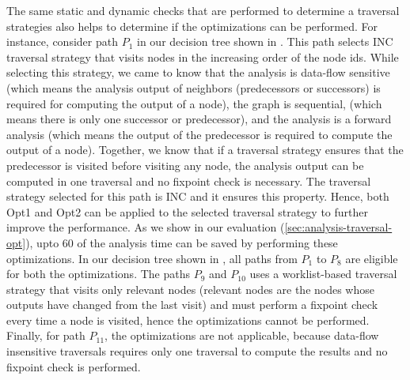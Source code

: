 The same static and dynamic checks that are performed to determine a traversal strategies
also helps to determine if the optimizations can be performed. For instance, consider path
$P_1$ in our decision tree shown in . This path selects INC traversal strategy that
visits nodes in the increasing order of the node ids. While selecting this strategy, we came to know that the analysis is data-flow sensitive (which means the analysis output of neighbors
(predecessors or successors) is required for computing the output of a node), the graph is
sequential, (which means there is only one successor or predecessor), and the analysis is a
forward analysis (which means the output of the predecessor is required to compute the
output of a node). Together, we know that if a traversal strategy ensures that the predecessor
is visited before visiting any node, the analysis output can be computed in one traversal and
no fixpoint check is necessary. The traversal strategy selected for this path is INC and it
ensures this property. Hence, both Opt1 and Opt2 can be applied to the selected traversal
strategy to further improve the performance. As we show in our evaluation (\ref{sec:analysis-traversal-opt}), upto 60%
of the analysis time can be saved by performing these optimizations.
In our decision tree shown in , all paths from $P_1$ to $P_8$ are eligible for both the
optimizations. The paths $P_9$ and $P_10$ uses a worklist-based traversal strategy that visits only
relevant nodes (relevant nodes are the nodes whose outputs have changed from the last visit)
and must perform a fixpoint check every time a node is visited, hence the optimizations
cannot be performed. Finally, for path $P_11$, the optimizations are not applicable, because
data-flow insensitive traversals requires only one traversal to compute the results and no
fixpoint check is performed.


